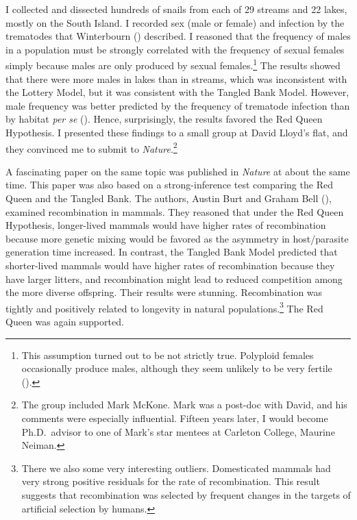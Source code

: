 \documentclass[
  american,
  letterpaper,
]{book}
\begin{document}
I collected and dissected hundreds of snails from each of 29 streams and
22 lakes, mostly on the South Island. I recorded sex (male or female)
and infection by the trematodes that Winterbourn
() described. I reasoned that the
frequency of males in a population must be strongly correlated with the
frequency of sexual females simply because males are only produced by
sexual females.\footnote{This assumption turned out to be not strictly
  true. Polyploid females occasionally produce males, although they seem
  unlikely to be very fertile ().} The results showed that there were more males in lakes
than in streams, which was inconsistent with the Lottery Model, but it
was consistent with the Tangled Bank Model. However, male frequency was
better predicted by the frequency of trematode infection than by habitat
\emph{per se} (). Hence,
surprisingly, the results favored the Red Queen Hypothesis. I presented
these findings to a small group at David Lloyd's flat, and they
convinced me to submit to \emph{Nature}.\footnote{The group included
  Mark McKone. Mark was a post-doc with David, and his comments were
  especially influential. Fifteen years later, I would become
  Ph.D.~advisor to one of Mark's star mentees at Carleton College,
  Maurine Neiman.}

A fascinating paper on the same topic was published in \emph{Nature} at
about the same time. This paper was also based on a strong-inference
test comparing the Red Queen and the Tangled Bank. The authors, Austin
Burt and Graham Bell (), examined
recombination in mammals. They reasoned that under the Red Queen
Hypothesis, longer-lived mammals would have higher rates of
recombination because more genetic mixing would be favored as the
asymmetry in host/parasite generation time increased. In contrast, the
Tangled Bank Model predicted that shorter-lived mammals would have
higher rates of recombination because they have larger litters, and
recombination might lead to reduced competition among the more diverse
offspring. Their results were stunning. Recombination was tightly and
positively related to longevity in natural populations.\footnote{There
  we also some very interesting outliers. Domesticated mammals had very
  strong positive residuals for the rate of recombination. This result
  suggests that recombination was selected by frequent changes in the
  targets of artificial selection by humans.} The Red Queen was again
supported.
\end{document}
